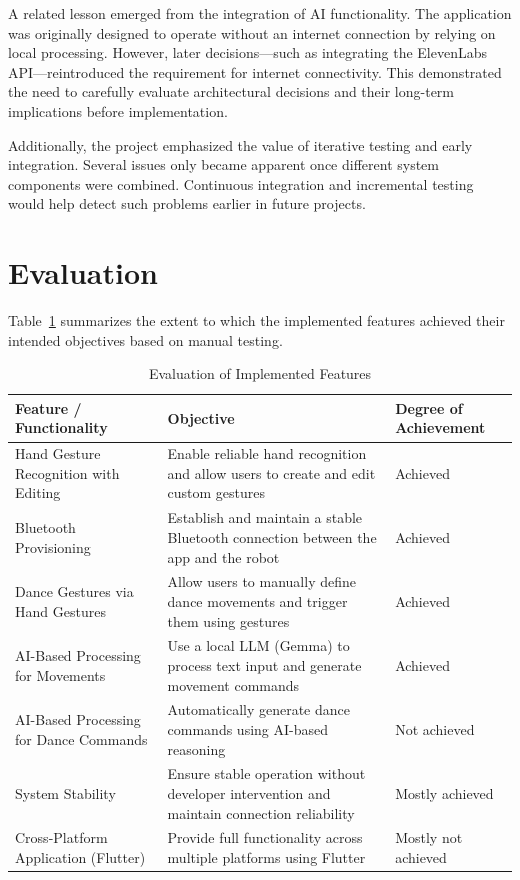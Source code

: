 \documentclass[11pt,a4paper]{article}
\begin{document}
A related lesson emerged from the integration of AI functionality. The application was originally designed to operate without an internet connection by relying on local processing. However, later decisions—such as integrating the ElevenLabs API—reintroduced the requirement for internet connectivity. This demonstrated the need to carefully evaluate architectural decisions and their long-term implications before implementation.

Additionally, the project emphasized the value of iterative testing and early integration. Several issues only became apparent once different system components were combined. Continuous integration and incremental testing would help detect such problems earlier in future projects.

\newpage
\section{Evaluation}

Table~\ref{tab:evaluation} summarizes the extent to which the implemented features achieved their intended objectives based on manual testing.

\begin{table}[h]
	\centering
	\caption{Evaluation of Implemented Features}
	\label{tab:evaluation}
	\begin{tabular}{|p{4.5cm}|p{6cm}|p{3cm}|}
		\hline
		\textbf{Feature / Functionality} & \textbf{Objective} & \textbf{Degree of Achievement} \\
		\hline
		Hand Gesture Recognition with Editing & Enable reliable hand recognition and allow users to create and edit custom gestures & Achieved \\
		\hline
		Bluetooth Provisioning & Establish and maintain a stable Bluetooth connection between the app and the robot & Achieved \\
		\hline
		Dance Gestures via Hand Gestures & Allow users to manually define dance movements and trigger them using gestures & Achieved \\
		\hline
		AI-Based Processing for Movements & Use a local LLM (Gemma) to process text input and generate movement commands & Achieved \\
		\hline
		AI-Based Processing for Dance Commands & Automatically generate dance commands using AI-based reasoning & Not achieved \\
		\hline
		System Stability & Ensure stable operation without developer intervention and maintain connection reliability & Mostly achieved \\
		\hline
		Cross-Platform Application (Flutter) & Provide full functionality across multiple platforms using Flutter & Mostly not achieved \\
		\hline
	\end{tabular}
\end{table}
\end{document}
